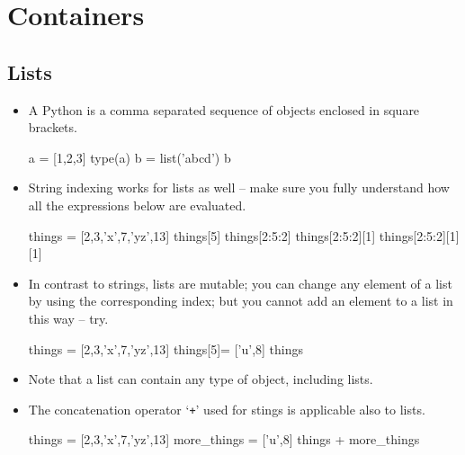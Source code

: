 \documentclass[a4paper]{article}
\begin{document}
\section{Containers}

\subsection{Lists}

\begin{itemize}
\item A Python  is a comma separated sequence of objects enclosed in
square brackets.


\begin{ucodeframe}
\begin{pyconsole}
a = [1,2,3]
type(a)
b = list('abcd')
b
\end{pyconsole}
\end{ucodeframe}



\item String indexing  works for lists as well -- make sure you fully understand
how all the expressions below are evaluated.


\begin{ucodeframe}
\begin{pyconsole}
things =  [2,3,'x',7,'yz',13]
things[5]
things[2:5:2]
things[2:5:2][1]
things[2:5:2][1][1]
\end{pyconsole}
\end{ucodeframe}

\item In contrast to strings, lists are mutable; you can change any element of a
list by using the corresponding index; but you cannot add an element to a list in
this way -- try.

\begin{ucodeframe}
\begin{pyconsole}
things =  [2,3,'x',7,'yz',13]
things[5]= ['u',8]
things
\end{pyconsole}
\end{ucodeframe}

\item Note that a list can contain any type of object, including lists.

\item The concatenation operator `\Verb-+-' used for stings is applicable also
to lists.

\begin{ucodeframe}
\begin{pyconsole}
things =  [2,3,'x',7,'yz',13]
more_things = ['u',8]
things + more_things
\end{pyconsole}
\end{ucodeframe}


\end{itemize}
\end{document}
